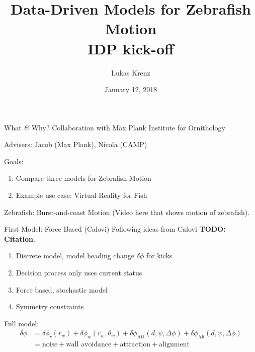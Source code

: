 \documentclass{beamer}
\title{Data-Driven Models for Zebrafish Motion\\IDP kick-off}
\author{Lukas Krenz}
\date{January 12, 2018}
\newcommand{\cn}{\textbf{TODO: Citation}}
\begin{document}
\maketitle
\begin{frame}{What \textit{\&} Why?}
Collaboration with Max Plank Institute for Ornithology

Advisers: Jacob (Max Plank), Nicola (CAMP)

Goals:
\begin{enumerate}
\item Compare three models for Zebrafish Motion
\item Example use case: Virtual Reality for Fish
\end{enumerate}
\end{frame}
\begin{frame}{Zebrafish: Burst-and-coast Motion} 
  (Video here that shows motion of zebrafish).
\end{frame}

\begin{frame}{First Model: Force Based (Calovi)}
Following ideas from Calovi \cn. 

\begin{enumerate}
\item Discrete model, model heading change $\delta \phi$ for kicks
\item Decision process only uses current status
\item Force based, stochastic model
\item Symmetry constraints 
\end{enumerate}

Full model:
\begin{align}
  \label{eq:calovi-model}
  \delta \phi &= \delta \phi_r (r_w) + \delta \phi_w (r_w, \theta_w) + \delta \phi_\text{Att} (d, \psi, \Delta \phi) + \delta \phi_\text{Ali}  (d, \psi, \Delta \phi) \\
  &= \text{noise} + \text{wall avoidance} + \text{attraction} + \text{alignment}
\end{align}
\end{frame}
\end{document}
